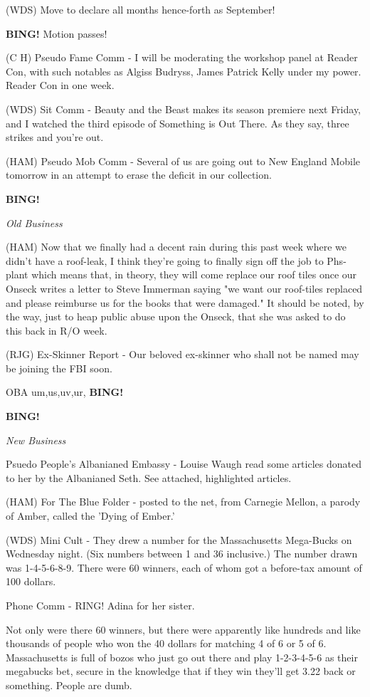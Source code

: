 \documentclass[12pt]{article}
\newcommand{\bing}{{\bf BING!} }
\newcommand{\goto}[1]{\bing \vskip 12pt \centerline{{\em{#1}}}}
\begin{document}
(WDS) Move to declare all months hence-forth as September!

\bing Motion passes!

(C H) Pseudo Fame Comm - I will be moderating the workshop panel at Reader Con, with such notables as Algiss Budryss, James Patrick Kelly under my power. Reader Con in one week.

(WDS) Sit Comm - Beauty and the Beast makes its season premiere next Friday, and I watched the third episode of Something is Out There. As they say, three strikes and you're out.

(HAM) Pseudo Mob Comm - Several of us are going out to New England Mobile tomorrow in an attempt to erase the deficit in our collection.

\goto{Old Business}

(HAM) Now that we finally had a decent rain during this past week where we didn't have a roof-leak, I think they're going to finally sign off the job to Phs-plant which means that, in theory, they will come replace our roof tiles once our Onseck writes a letter to Steve Immerman saying "we want our roof-tiles replaced and please reimburse us for the books that were damaged." It should be noted, by the way, just to heap public abuse upon the Onseck, that she was asked to do this back in R/O week.

(RJG) Ex-Skinner Report - Our beloved ex-skinner who shall not be named may be joining the FBI soon.

OBA um,us,uv,ur, \bing

\goto{New Business}

Psuedo People's Albanianed Embassy - Louise Waugh read some articles donated to her by the Albanianed Seth. See attached, highlighted articles.

(HAM) For The Blue Folder - posted to the net, from Carnegie Mellon, a parody of Amber, called the 'Dying of Ember.'

(WDS) Mini Cult - They drew a number for the Massachusetts Mega-Bucks on Wednesday night. (Six numbers between 1 and 36 inclusive.) The number drawn was 1-4-5-6-8-9.  There were 60 winners, each of whom got a before-tax amount of 100 dollars.

Phone Comm - RING! Adina for her sister.

Not only were there 60 winners, but there were apparently like hundreds and like thousands of people who won the 40 dollars for matching 4 of 6 or 5 of 6.  Massachusetts is full of bozos who just go out there and play 1-2-3-4-5-6 as their megabucks bet, secure in the knowledge that if they win they'll get 3.22 back or something. People are dumb.
\end{document}
